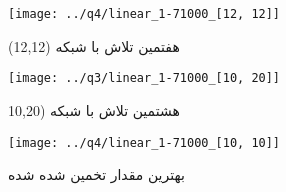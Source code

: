 \documentclass[a4paper,12pt]{article}
\begin{document}
\begin{figure}[!htb]
  \texttt{[image: ../q4/linear\_1-71000\_[12, 12]]}
  \caption{  هفتمین تلاش با شبکه (12,12) }
\endminipage\hfill
{}
  \texttt{[image: ../q3/linear\_1-71000\_[10, 20]]}
  \caption{هشتمین تلاش با شبکه (10,20 }
\endminipage\hfill
\end{figure}


\begin{figure}[H]
\begin{center}
  \texttt{[image: ../q4/linear\_1-71000\_[10, 10]]}
  \center
  \caption{ بهترین مقدار تخمین شده شده}
\end{center}
\end{figure}
\end{document}
